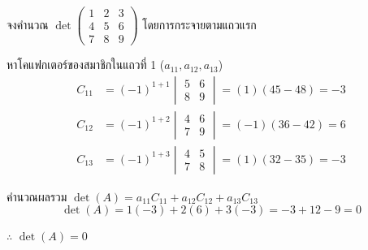 \begin{ex}
\label{ex:det-cofactor}
จงคำนวณ $\det\begin{pmatrix} 1 & 2 & 3 \\ 4 & 5 & 6 \\ 7 & 8 & 9 \end{pmatrix}$ โดยการกระจายตามแถวแรก
\end{ex}
\begin{solution}
หาโคแฟกเตอร์ของสมาชิกในแถวที่ 1 ($a_{11}, a_{12}, a_{13}$) \begin{align*}
    C_{11} &= (-1)^{1+1}\begin{vmatrix} 5 & 6 \\ 8 & 9 \end{vmatrix} = (1)(45-48) = -3\\
    C_{12} &= (-1)^{1+2}\begin{vmatrix} 4 & 6 \\ 7 & 9 \end{vmatrix} = (-1)(36-42) = 6\\
    C_{13} &= (-1)^{1+3}\begin{vmatrix} 4 & 5 \\ 7 & 8 \end{vmatrix} = (1)(32-35) = -3
    \end{align*}

คำนวณผลรวม $\det(A) = a_{11}C_{11} + a_{12}C_{12} + a_{13}C_{13}$ \[ \det(A) = 1(-3) + 2(6) + 3(-3) = -3 + 12 - 9 = 0 \]

$\therefore$ $\det(A) = 0$ \solhere
\end{solution}

